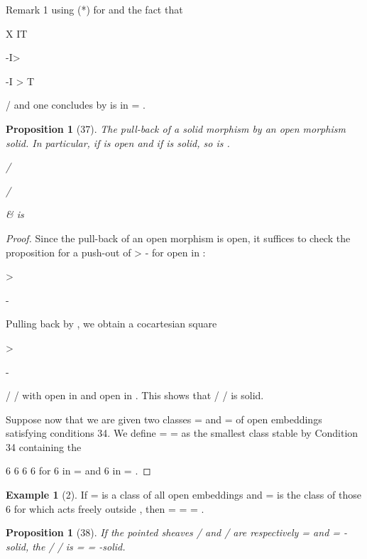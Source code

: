 \documentclass[11pt,a4paper]{article}
\theoremstyle{plain}
\newtheorem{proposition}[theorem]{Proposition}
\theoremstyle{definition}
\newtheorem{example}[theorem]{Example}
\begin{document}
Remark 1 using (*) for  and the fact that 

 






X IT

-I>

-I > T

/  and one concludes by
 is in = .





\begin{proposition}[37]
The pull-back of a solid morphism by an open morphism
solid. In particular, if
is open and if is solid, so is .

 /

/

\& is

\end{proposition}

\begin{proof} Since the pull-back of an open morphism is open, it suffices to check the
proposition for a push-out of >  - for open in :







  


>



-







Pulling back by , we obtain a cocartesian square

    


>

-

/   /
with   open in  and   open in  . This shows that / 
/ is solid.

Suppose now that we are given two classes = and =  of open embeddings satisfying conditions 34. We define =  =  as the smallest class stable by Condition 34
containing the

  6      6   6  6 
for   6 in = and    6  in =  .
\end{proof}

\begin{example}[2]
If = is a class of all open embeddings and =  is the class of those
   6  for which acts freely outside  , then =  =  = .
\end{example}

\begin{proposition}[38]
If the pointed sheaves / and /  are respectively = and =  -solid,
the / /  is =  =  -solid.
\end{proposition}
\end{document}
